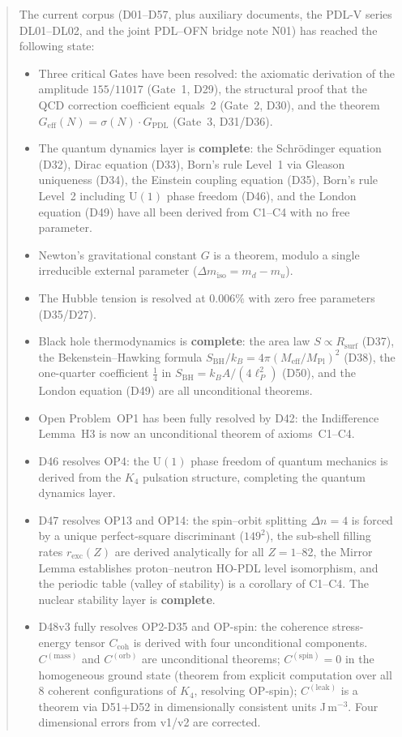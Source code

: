 \documentclass[11pt,a4paper]{article}
\theoremstyle{plain}
\theoremstyle{definition}
\theoremstyle{remark}
\newcommand{\Kfour}{K_4}
\newcommand{\Geff}{G_{\mathrm{eff}}}
\newcommand{\GPDL}{G_{\mathrm{PDL}}}
\newcommand{\Rsurf}{R_{\mathrm{surf}}}
\newcommand{\sigmaN}{\sigma(N)}
\newcommand{\SBH}{S_{\mathrm{BH}}}
\newcommand{\Meff}{M_{\mathrm{eff}}}
\newcommand{\MPl}{M_{\mathrm{Pl}}}
\newcommand{\Ccoh}{C_{\mathrm{coh}}}
\begin{document}
\begin{abstract}
The current corpus (D01--D57, plus auxiliary documents, the PDL-V series DL01--DL02, and the joint PDL--OFN bridge note N01) has reached the following state:
\begin{itemize}
\item Three critical Gates have been resolved: the axiomatic derivation of the amplitude $155/11017$ (Gate~1, D29), the structural proof that the QCD correction coefficient equals~2 (Gate~2, D30), and the theorem $\Geff(N)=\sigmaN\cdot\GPDL$ (Gate~3, D31/D36).
\item The quantum dynamics layer is \textbf{complete}: the Schr\"odinger equation (D32), Dirac equation (D33), Born's rule Level~1 via Gleason uniqueness (D34), the Einstein coupling equation (D35), Born's rule Level~2 including $\mathrm{U}(1)$ phase freedom (D46), and the London equation (D49) have all been derived from C1--C4 with no free parameter.
\item Newton's gravitational constant $G$ is a theorem, modulo a single irreducible external parameter ($\Delta m_{\mathrm{iso}} = m_d - m_u$).
\item The Hubble tension is resolved at $0.006\%$ with zero free parameters (D35/D27).
\item Black hole thermodynamics is \textbf{complete}: the area law $S \propto \Rsurf$ (D37), the Bekenstein--Hawking formula $\SBH/k_B = 4\pi(\Meff/\MPl)^2$ (D38), the one-quarter coefficient $\tfrac{1}{4}$ in $\SBH = k_B A/(4\ell_P^2)$ (D50), and the London equation (D49) are all unconditional theorems.
\item Open Problem~OP1 has been fully resolved by D42: the Indifference Lemma~H3 is now an unconditional theorem of axioms~C1--C4.
\item D46 resolves OP4: the $\mathrm{U}(1)$ phase freedom of quantum mechanics is derived from the $\Kfour$ pulsation structure, completing the quantum dynamics layer.
\item D47 resolves OP13 and OP14: the spin--orbit splitting $\Delta n = 4$ is forced by a unique perfect-square discriminant ($149^2$), the sub-shell filling rates $r_{\mathrm{exc}}(Z)$ are derived analytically for all $Z = 1$--82, the Mirror Lemma establishes proton--neutron HO-PDL level isomorphism, and the periodic table (valley of stability) is a corollary of C1--C4. The nuclear stability layer is \textbf{complete}.
\item D48v3 fully resolves OP2-D35 and OP-spin: the coherence stress-energy tensor $\Ccoh$ is derived with four unconditional components. $C^{(\mathrm{mass})}$ and $C^{(\mathrm{orb})}$ are unconditional theorems; $C^{(\mathrm{spin})}=0$ in the homogeneous ground state (theorem from explicit computation over all 8 coherent configurations of $K_4$, resolving OP-spin); $C^{(\mathrm{leak})}$ is a theorem via D51+D52 in dimensionally consistent units J\,m$^{-3}$. Four dimensional errors from v1/v2 are corrected.

\end{itemize}
\end{abstract}
\end{document}
